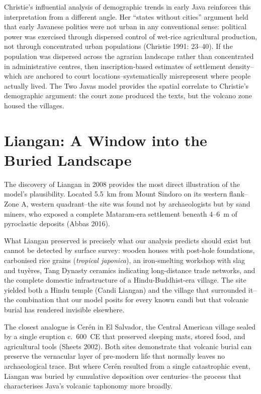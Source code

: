 \documentclass[12pt,a4paper]{article}
\begin{document}
Christie's influential analysis of demographic trends in early Java reinforces this interpretation from a different angle.
Her ``states without cities'' argument held that early Javanese polities were not urban in any conventional sense: political power was exercised through dispersed control of wet-rice agricultural production, not through concentrated urban populations (Christie 1991: 23--40).
If the population was dispersed across the agrarian landscape rather than concentrated in administrative centres, then inscription-based estimates of settlement density--which are anchored to court locations--systematically misrepresent where people actually lived.
The Two Javas model provides the spatial correlate to Christie's demographic argument: the court zone produced the texts, but the volcano zone housed the villages.


\section{Liangan: A Window into the Buried Landscape}

The discovery of Liangan in 2008 provides the most direct illustration of the model's plausibility.
Located 5.5~km from Mount Sindoro on its western flank--Zone A, western quadrant--the site was found not by archaeologists but by sand miners, who exposed a complete Mataram-era settlement beneath 4--6~m of pyroclastic deposits (Abbas 2016).

What Liangan preserved is precisely what our analysis predicts should exist but cannot be detected by surface survey: wooden houses with post-hole foundations, carbonised rice grains (\emph{tropical japonica}), an iron-smelting workshop with slag and tuyères, Tang Dynasty ceramics indicating long-distance trade networks, and the complete domestic infrastructure of a Hindu-Buddhist-era village.
The site yielded both a Hindu temple (Candi Liangan) and the village that surrounded it--the combination that our model posits for every known candi but that volcanic burial has rendered invisible elsewhere.

The closest analogue is Cerén in El Salvador, the Central American village sealed by a single eruption c.~600~CE that preserved sleeping mats, stored food, and agricultural tools (Sheets 2002).
Both sites demonstrate that volcanic burial can preserve the vernacular layer of pre-modern life that normally leaves no archaeological trace.
But where Cerén resulted from a single catastrophic event, Liangan was buried by cumulative deposition over centuries--the process that characterises Java's volcanic taphonomy more broadly.
\end{document}
